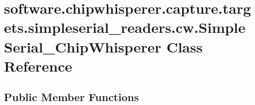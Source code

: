 \hypertarget{classsoftware_1_1chipwhisperer_1_1capture_1_1targets_1_1simpleserial__readers_1_1cw_1_1SimpleSerial__ChipWhisperer}{}\section{software.\+chipwhisperer.\+capture.\+targets.\+simpleserial\+\_\+readers.\+cw.\+Simple\+Serial\+\_\+\+Chip\+Whisperer Class Reference}
\label{classsoftware_1_1chipwhisperer_1_1capture_1_1targets_1_1simpleserial__readers_1_1cw_1_1SimpleSerial__ChipWhisperer}
\subsection*{Public Member Functions}
